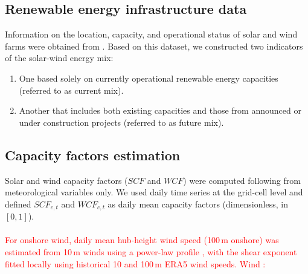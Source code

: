 \documentclass[pdflatex,sn-mathphys-num]{sn-jnl}%
\begin{document}
\subsection{Renewable energy infrastructure data}\label{sec:infrastr_data}

Information on the location, capacity, and operational status of solar and wind farms were obtained from \cite{energyinfra}. Based on this dataset, we constructed two indicators of the solar-wind energy mix:
\begin{enumerate}
\item One based solely on currently operational renewable energy capacities (referred to as current mix).
\item Another that includes both existing capacities and those from announced or under construction projects (referred to as future mix).
\end{enumerate}



\subsection{Capacity factors estimation}\label{sec:cf_estimation}

Solar and wind capacity factors ($SCF$ and $WCF$) were computed following \cite{vanderwielMeteorologicalConditionsLeading2019} from meteorological variables only. We used daily time series at the grid-cell level and defined $SCF_{c,t}$ and $WCF_{c,t}$ as daily mean capacity factors (dimensionless, in $[0,1]$).\\
\\
\textcolor{red}{For onshore wind, daily mean hub-height wind speed (100\,m onshore) was estimated from 10\,m winds using a power-law profile \cite{Peterson1978}, with the shear exponent fitted locally using historical 10 and 100\,m ERA5 wind speeds. Wind  : }
\end{document}
